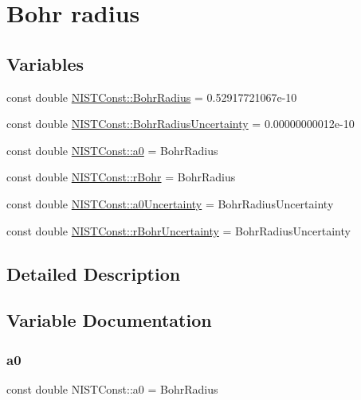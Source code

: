 \hypertarget{group___n_i_s_t_const-_bohr_radius}{}\section{Bohr radius}
\label{group___n_i_s_t_const-_bohr_radius}
\subsection*{Variables}
\begin{DoxyCompactItemize}
\item 
const double \hyperlink{group___n_i_s_t_const-_bohr_radius_ga38bdb86c2f3e484e8b164e75a3980638}{N\+I\+S\+T\+Const\+::\+Bohr\+Radius} = 0.\+52917721067e-\/10
\item 
const double \hyperlink{group___n_i_s_t_const-_bohr_radius_gad031da8c7a2e239441e06c10fd8f6f07}{N\+I\+S\+T\+Const\+::\+Bohr\+Radius\+Uncertainty} = 0.\+00000000012e-\/10
\item 
const double \hyperlink{group___n_i_s_t_const-_bohr_radius_gaa79b6b930d252d0cda2711c7993e918a}{N\+I\+S\+T\+Const\+::a0} = Bohr\+Radius
\item 
const double \hyperlink{group___n_i_s_t_const-_bohr_radius_gad2a74a106c13086263e42411835b6352}{N\+I\+S\+T\+Const\+::r\+Bohr} = Bohr\+Radius
\item 
const double \hyperlink{group___n_i_s_t_const-_bohr_radius_ga69cffcfd4d8bdc8525818d56ac079b8d}{N\+I\+S\+T\+Const\+::a0\+Uncertainty} = Bohr\+Radius\+Uncertainty
\item 
const double \hyperlink{group___n_i_s_t_const-_bohr_radius_ga5cbe12af6cb3e4962e629970564c7905}{N\+I\+S\+T\+Const\+::r\+Bohr\+Uncertainty} = Bohr\+Radius\+Uncertainty
\end{DoxyCompactItemize}


\subsection{Detailed Description}


\subsection{Variable Documentation}
\mbox{\label{group___n_i_s_t_const-_bohr_radius_gaa79b6b930d252d0cda2711c7993e918a}} 
\subsubsection{\texorpdfstring{a0}{a0}}
{\footnotesize\ttfamily const double N\+I\+S\+T\+Const\+::a0 = Bohr\+Radius}

